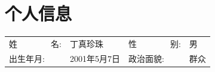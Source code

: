 \begin{figure}[h]
    \begin{minipage}{0.82\textwidth}
        \section{\makebox[\widthof{\faAddressCard}][c]{\color{SCU_Red}{\faAddressCard}}\quad 个人信息}
        \begin{tabularx}{\linewidth}{p{}Xp{}X}
            姓\ \ \ \ \ \ \ \ 名: & 丁真珍珠 & 
            性\ \ \ \ \ \ \ \ 别: & 男  \\
            出生年月: & 2001年5月7日 & 
            政治面貌: & 群众 \\
        \end{tabularx}
    \end{minipage}
    \hspace{2em}
    \begin{minipage}{0.12\textwidth}
        \setlength{\fboxsep}{0pt}
    \end{minipage}
\end{figure}
\vspace{-1em}

